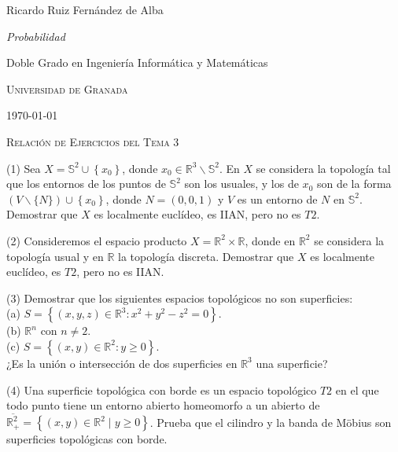 \documentclass[
  a4paper,
  spanish,
  12pt,
]{scrartcl}
\begin{document}
\begin{flushright}
  Ricardo Ruiz Fernández de Alba\vspace{.5em}

  \textit{Probabilidad}

  Doble Grado en Ingeniería Informática y Matemáticas

  \textsc{Universidad de Granada}\vspace{.5em}

  \today\vspace{.5em}
\end{flushright}

\begin{flushleft}
  \scshape\Large Relación de Ejercicios del Tema 3
\end{flushleft}

\begin{ejer}
(1) Sea $X=\mathbb{S}^{2} \cup\left\{x_{0}\right\}$, donde $x_{0} \in \mathbb{R}^{3} \backslash \mathbb{S}^{2}$. En $X$ se considera la topología tal que los entornos de los puntos de $\mathbb{S}^{2}$ son los usuales, y los de $x_{0}$ son de la forma $(V \backslash\{N\}) \cup\left\{x_{0}\right\}$, donde $N=(0,0,1)$ y $V$ es un entorno de $N$ en $\mathbb{S}^{2}$. Demostrar que $X$ es localmente euclídeo, es IIAN, pero no es $T 2$.\\
\end{ejer}

\begin{ejer}
(2) Consideremos el espacio producto $X=\mathbb{R}^{2} \times \mathbb{R}$, donde en $\mathbb{R}^{2}$ se considera la topología usual y en $\mathbb{R}$ la topología discreta. Demostrar que $X$ es localmente euclídeo, es $T 2$, pero no es IIAN.\\
\end{ejer}

\begin{ejer}
(3) Demostrar que los siguientes espacios topológicos no son superficies:\\
(a) $S=\left\{(x, y, z) \in \mathbb{R}^{3}: x^{2}+y^{2}-z^{2}=0\right\}$.\\
(b) $\mathbb{R}^{n}$ con $n \neq 2$.\\
(c) $S=\left\{(x, y) \in \mathbb{R}^{2}: y \geq 0\right\}$.\\
¿Es la unión o intersección de dos superficies en $\mathbb{R}^{3}$ una superficie?\\
\end{ejer}

\begin{ejer}
(4) Una superficie topológica con borde es un espacio topológico $T 2$ en el que todo punto tiene un entorno abierto homeomorfo a un abierto de $\overline{\mathbb{R}_{+}^{2}}=\left\{(x, y) \in \mathbb{R}^{2} \mid y \geq 0\right\}$. Prueba que el cilindro y la banda de Möbius son superficies topológicas con borde.\\
\end{ejer}
\end{document}
